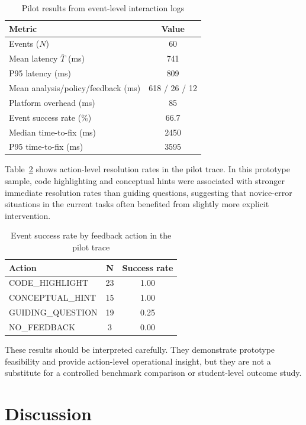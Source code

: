 ﻿\documentclass[conference]{IEEEtran}
\begin{document}
\begin{table}[t]
\centering
\caption{Pilot results from event-level interaction logs}
\label{tab:results}
\renewcommand{\arraystretch}{1.15}
\begin{tabular}{lc}
\hline
\textbf{Metric} & \textbf{Value} \\
\hline
Events ($N$) & 60 \\
Mean latency $\bar{T}$ (ms) & 741 \\
P95 latency (ms) & 809 \\
Mean analysis/policy/feedback (ms) & 618 / 26 / 12 \\
Platform overhead (ms) & 85 \\
Event success rate (\%) & 66.7 \\
Median time-to-fix (ms) & 2450 \\
P95 time-to-fix (ms) & 3595 \\
\hline
\end{tabular}
\end{table}

Table~\ref{tab:action_success} shows action-level resolution rates in the pilot trace. In this prototype sample, code highlighting and conceptual hints were associated with stronger immediate resolution rates than guiding questions, suggesting that novice-error situations in the current tasks often benefited from slightly more explicit intervention.

\begin{table}[t]
\centering
\caption{Event success rate by feedback action in the pilot trace}
\label{tab:action_success}
\renewcommand{\arraystretch}{1.15}
\begin{tabular}{lcc}
\hline
\textbf{Action} & \textbf{N} & \textbf{Success rate} \\
\hline
CODE\_HIGHLIGHT & 23 & 1.00 \\
CONCEPTUAL\_HINT & 15 & 1.00 \\
GUIDING\_QUESTION & 19 & 0.25 \\
NO\_FEEDBACK & 3 & 0.00 \\
\hline
\end{tabular}
\end{table}

These results should be interpreted carefully. They demonstrate prototype feasibility and provide action-level operational insight, but they are not a substitute for a controlled benchmark comparison or student-level outcome study.

\section{Discussion}
\end{document}
